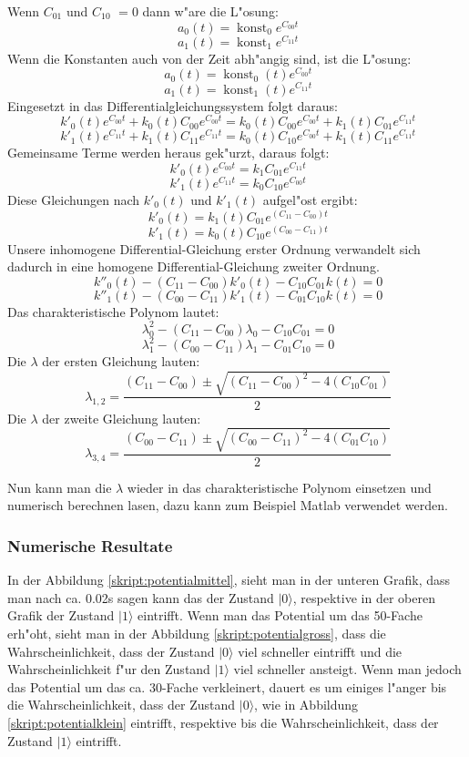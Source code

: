 \begin{refsection}
Wenn $ C_{01}$ und $ C_{10}$ $ =0$ dann w"are die L"osung:
\[
\ a_{0}(t) = \operatorname{konst}_0 e^{C_{00} t} 
\]
\[
\ a_{1}(t) = \operatorname{konst}_1 e^{C_{11} t}
\]
Wenn die Konstanten auch von der Zeit abh"angig sind, ist die L"osung: 
\[
\ a_{0}(t) = \operatorname{konst}_0(t) e^{C_{00} t} 
\]
\[
\ a_{1}(t) = \operatorname{konst}_1(t) e^{C_{11} t} 
\]
Eingesetzt in das Differentialgleichungssystem folgt daraus:
\[
\ k'_{0}(t) e^{C_{00} t} + k_{0}(t) C_{00} e^{C_{00} t} = k_{0}(t) C_{00} e^{C_{00} t} + k_{1}(t)C_{01}e^{C_{11} t}
\]
\[
\ k'_{1}(t) e^{C_{11} t} + k_{1}(t) C_{11} e^{C_{11} t} = k_{0}(t) C_{10} e^{C_{00} t} + k_{1}(t)C_{11}e^{C_{11} t}
\]
Gemeinsame Terme werden heraus gek"urzt, daraus folgt:
\[
\ k'_{0}(t) e^{C_{00} t} = k_{1} C_{01} e^{C_{11} t}
\]
\[
\ k'_{1}(t) e^{C_{11} t} = k_{0} C_{10} e^{C_{00} t}
\]
Diese Gleichungen nach $ k'_{0}(t)$ und $ k'_{1}(t)$ aufgel"ost ergibt:
\[
\ k'_{0}(t) = k_{1}(t) C_{01} e^{(C_{11}-C_{00}) t}
\]
\[
\ k'_{1}(t) = k_{0}(t) C_{10} e^{(C_{00}-C_{11}) t}
\]
Unsere inhomogene Differential-Gleichung erster Ordnung verwandelt
sich dadurch in eine homogene Differential-Gleichung zweiter Ordnung.
\[ 
\ k''_{0}(t) - (C_{11}-C_{00}) k'_{0}(t) - C_{10}C_{01}k(t) = 0
\]
\[
\ k''_{1}(t) - (C_{00}-C_{11}) k'_{1}(t) - C_{01}C_{10}k(t) = 0
\]
Das charakteristische Polynom lautet:
\[
\ \lambda_{0}^{2} - (C_{11}-C_{00})\lambda_{0} - C_{10}C_{01} = 0
\]
\[
\ \lambda_{1}^{2} - (C_{00}-C_{11})\lambda_{1} - C_{01}C_{10} = 0
\]
Die $ \lambda $ der ersten Gleichung lauten:
\[
\ \lambda_{1,2} = \frac{(C_{11}-C_{00})\pm \sqrt{(C_{11}-C_{00})^2-4(C_{10}C_{01})}}{2}
\]
Die $ \lambda $ der zweite Gleichung lauten:
\[
\ \lambda_{3,4} = \frac{(C_{00}-C_{11})\pm \sqrt{(C_{00}-C_{11})^2-4(C_{01}C_{10})}}{2}
\]

Nun kann man die $\lambda$ wieder in das charakteristische Polynom
einsetzen und numerisch berechnen lasen, dazu kann zum Beispiel Matlab
verwendet werden.

\subsubsection{Numerische Resultate}
In der Abbildung \ref{skript:potentialmittel}, sieht man in der unteren
Grafik, dass man nach ca. 0.02s sagen kann das der Zustand $|0\rangle$, 
respektive in der oberen Grafik der Zustand $|1\rangle$ eintrifft.
Wenn man das Potential um das 50-Fache erh"oht, sieht man in der Abbildung
\ref{skript:potentialgross}, dass die Wahrscheinlichkeit, dass der Zustand
$|0\rangle$ viel schneller eintrifft und die Wahrscheinlichkeit f"ur den
Zustand $|1\rangle$ viel schneller ansteigt.
Wenn man jedoch das Potential um das ca. 30-Fache verkleinert, dauert es
um einiges l"anger bis die Wahrscheinlichkeit, dass der Zustand $|0\rangle$,
wie in Abbildung \ref{skript:potentialklein} eintrifft, respektive bis
die Wahrscheinlichkeit, dass der Zustand $|1\rangle$ eintrifft.


\end{refsection}
